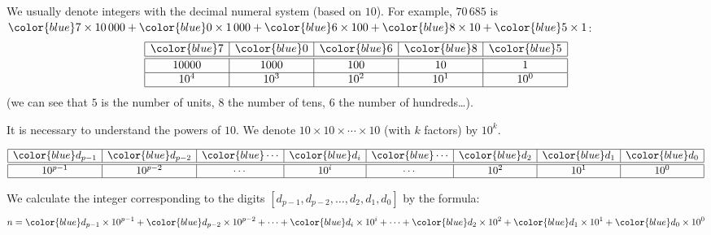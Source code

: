 \documentclass[11pt,class=report,crop=false]{standalone}
\begin{document}





\begin{cours}


We usually denote integers with the decimal numeral system (based on $10$). For example, $70\,685$ is 
${\color{blue}7} \times 10\,000
+{\color{blue}0} \times 1\,000
+{\color{blue}6} \times 100
+{\color{blue}8} \times 10 
+{\color{blue}5} \times 1$: 
$$
\begin{array}{|c|c|c|c|c|}
  \hline
  {\color{blue}7} & {\color{blue}0} & {\color{blue}6} & {\color{blue}8} & {\color{blue}5} \\ 
  \hline\hline
  10000 & 1000 & 100 & 10 & 1 \\\hline
  10^4 & 10^3 & 10^2 & 10^1 & 10^0 \\
  \hline
\end{array}
$$   
(we can see that $5$ is the number of units, $8$ the number of tens, $6$ the number of hundreds\ldots). 

It is necessary to understand the powers of $10$. We denote $10 \times 10 \times \cdots \times 10$ (with $k$ factors) by $10^k$.

$$
\begin{array}{|c|c|c|c|c|c|c|c|}
  \hline
  {\color{blue}d_{p-1}} & {\color{blue}d_{p-2}}& {\color{blue}\cdots} & {\color{blue}d_i}& {\color{blue}\cdots} & {\color{blue}d_2} & {\color{blue}d_1} & {\color{blue}d_0} \\ 
  \hline\hline
  10^{p-1} & 10^{p-2} & \cdots & 10^i &\cdots & 10^2 & 10^1 & 10^0 \\
  \hline
\end{array}
$$   
  
We calculate the integer corresponding to the digits $[d_{p-1},d_{p-2}, \ldots,d_2,d_1,d_0]$ by the formula:
$$n = {\color{blue}d_{p-1}} \times 10^{p-1} + {\color{blue}d_{p-2}} \times 10^{p-2} + \cdots + {\color{blue}d_i} \times 10^{i} +  \cdots + {\color{blue}d_2} \times 10^2 + {\color{blue}d_1} \times 10^1 + {\color{blue}d_0} \times 10^0$$
\end{cours}
\end{document}
